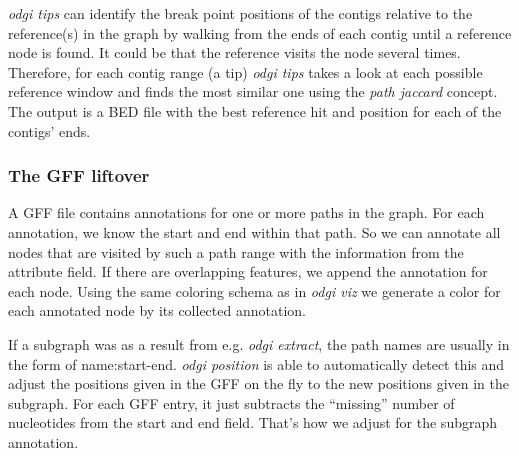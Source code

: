 \documentclass{bioinfo}
\begin{document}
\textit{odgi tips} can identify the break point positions of the contigs relative to the reference(s) in the graph by walking from the ends of each contig until a reference node is found.
It could be that the reference visits the node several times. Therefore, for each contig range (a tip) \textit{odgi tips} takes a look at each possible reference window and finds the most similar one using the \textit{path jaccard} concept.
The output is a BED file with the best reference hit and position for each of the contigs' ends.

\subsubsection{The GFF liftover}
\label{sec:supp_gff}
A GFF file contains annotations for one or more paths in the graph. For each annotation, we know the start and end within that path. So we can annotate all nodes that are visited by such a path range with the information from the attribute field. If there are overlapping features, we append the annotation for each node. Using the same coloring schema as in \textit{odgi viz} we generate a color for each annotated node by its collected annotation.

If a subgraph was as a result from e.g. \textit{odgi extract}, the path names are usually in the form of name:start-end. \textit{odgi position} is able to automatically detect this and adjust the positions given in the GFF on the fly to the new positions given in the subgraph. For each GFF entry, it just subtracts the “missing” number of nucleotides from the start and end field. That’s how we adjust for the subgraph annotation.
\end{document}
